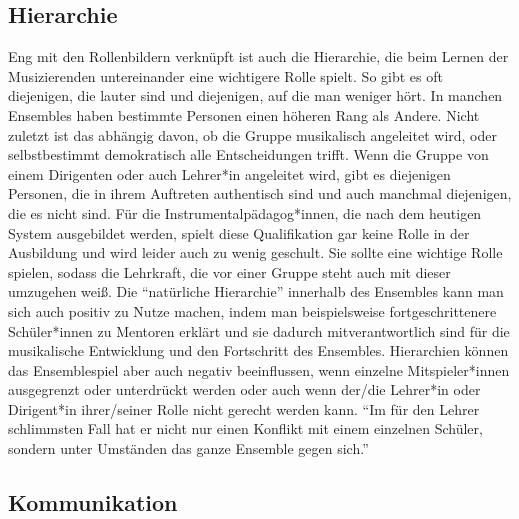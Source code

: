 \subsection{Hierarchie}

Eng mit den Rollenbildern verknüpft ist auch die Hierarchie, die beim Lernen der
Musizierenden untereinander eine wichtigere Rolle spielt. So gibt es oft
diejenigen, die lauter sind und diejenigen, auf die man weniger hört. In manchen
Ensembles haben bestimmte Personen einen höheren Rang als Andere. Nicht zuletzt
ist das abhängig davon, ob die Gruppe musikalisch angeleitet wird, oder
selbstbestimmt demokratisch alle Entscheidungen trifft. Wenn die Gruppe von
einem Dirigenten oder auch Lehrer*in angeleitet wird, gibt es diejenigen
Personen, die in ihrem Auftreten authentisch sind und auch manchmal diejenigen,
die es nicht sind. Für die Instrumentalpädagog*innen, die nach dem heutigen
System ausgebildet werden, spielt diese Qualifikation gar keine Rolle in der
Ausbildung und wird leider auch zu wenig geschult. Sie sollte eine wichtige
Rolle spielen, sodass die Lehrkraft, die vor einer Gruppe steht auch mit dieser
umzugehen weiß. Die \enquote{natürliche Hierarchie} innerhalb des Ensembles kann
man sich auch positiv zu Nutze machen, indem man beispielsweise
fortgeschrittenere Schüler*innen zu Mentoren erklärt und sie dadurch
mitverantwortlich sind für die musikalische Entwicklung und den Fortschritt des
Ensembles.\autocite[95]{doerne:umfassend_musizieren} Hierarchien können das
Ensemblespiel aber auch negativ beeinflussen, wenn einzelne Mitspieler*innen
ausgegrenzt oder unterdrückt werden oder auch wenn der/die Lehrer*in oder
Dirigent*in ihrer/seiner Rolle nicht gerecht werden kann. \enquote{Im für den
Lehrer schlimmsten Fall hat er nicht nur einen Konflikt mit einem einzelnen
Schüler, sondern unter Umständen das ganze Ensemble gegen
sich.}\autocite[94]{mitzscherlich:musikpsychologie}



\subsection{Kommunikation}

